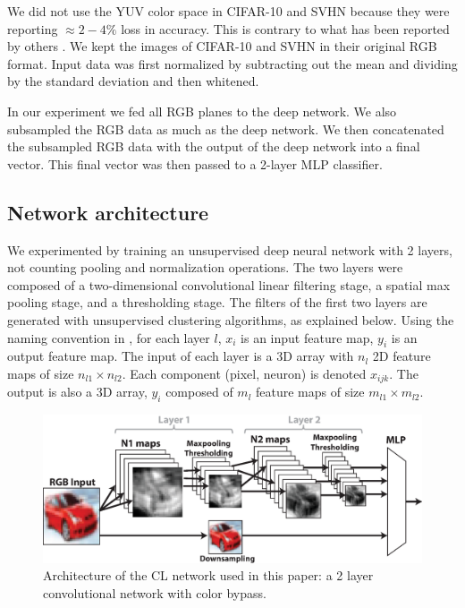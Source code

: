 \documentclass{article} %
\begin{document}
We did not use the YUV color space in CIFAR-10 and SVHN because they were reporting $\approx 2-4\%$ loss in accuracy.
This is contrary to what has been reported by others \cite{jarrett_what_2009}.
We kept the images of CIFAR-10 and SVHN in their original RGB format.
Input data was first normalized by subtracting out the mean and dividing by the standard deviation and then whitened.

In our experiment we fed all RGB planes to the deep network.
We also subsampled the RGB data as much as the deep network.
We then concatenated the subsampled RGB data with the output of the deep network into a final vector.
This final vector was then passed to a 2-layer MLP classifier.

\subsection{Network architecture}
\label{sec-net-arch}

We experimented by training an unsupervised deep neural network with 2 layers, not counting pooling and normalization operations.
The two layers were composed of a two-dimensional convolutional linear filtering stage, a spatial max pooling stage, and a thresholding stage. 
The filters of the first two layers are generated with unsupervised clustering algorithms, as explained below. 
Using the naming convention in \cite{lecun_convolutional_2010}, for each layer $l$, $x_i$ is an input feature map, $y_i$ is an output feature map.
The input of each layer is a 3D array with $n_l$ 2D feature maps of size $n_{l1} \times n_{l2}$.
Each component (pixel, neuron) is denoted $x_{ijk}$.
The output is also a 3D array, $y_i$ composed of $m_l$ feature maps of size $m_{l1} \times m_{l2}$.


\begin{figure}
\includegraphics[width=5in]{overall-structure.eps}
\caption{Architecture of the CL network used in this paper: a 2 layer convolutional network with color bypass.}
\label{fig-netarch}
\end{figure}
\end{document}
